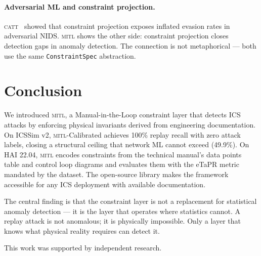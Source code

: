 \documentclass[sigconf,anonymous,review]{acmart}
\newcommand{\mitl}{\textsc{mitl}\xspace}
\newcommand{\catt}{\textsc{catt}\xspace}
\begin{document}
\paragraph{Adversarial ML and constraint projection.}
\catt~\cite{catt2026} showed that constraint projection exposes inflated
evasion rates in adversarial NIDS.  \mitl shows the other side: constraint
projection closes detection gaps in anomaly detection.  The connection is
not metaphorical — both use the same \texttt{ConstraintSpec} abstraction.

\section{Conclusion}
\label{sec:conclusion}

We introduced \mitl, a Manual-in-the-Loop constraint layer that detects ICS
attacks by enforcing physical invariants derived from engineering
documentation.  On ICSSim v2, \mitl-Calibrated achieves 100\% replay recall
with zero attack labels, closing a structural ceiling that network ML cannot
exceed (49.9\%).  On HAI 22.04, \mitl encodes constraints from the technical
manual's data points table and control loop diagrams and evaluates them with
the eTaPR metric mandated by the dataset.  The open-source library makes the
framework accessible for any ICS deployment with available documentation.

The central finding is that the constraint layer is not a replacement for
statistical anomaly detection — it is the layer that operates where statistics
cannot.  A replay attack is not anomalous; it is physically impossible.
Only a layer that knows what physical reality requires can detect it.

\begin{acks}
This work was supported by independent research.
\end{acks}
\end{document}

